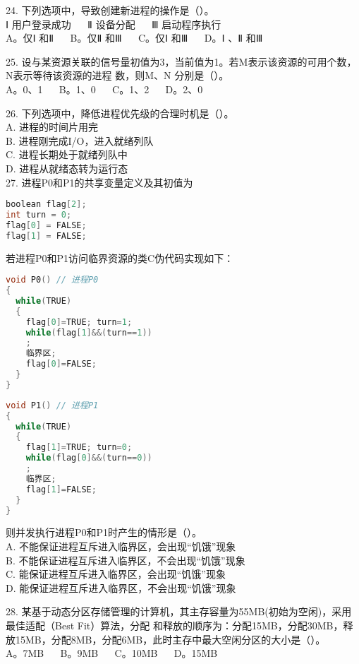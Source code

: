 24. 下列选项中，导致创建新进程的操作是（）。 \\
Ⅰ 用户登录成功 $\quad$ Ⅱ 设备分配 $\quad$ Ⅲ 启动程序执行 \\
A。仅Ⅰ 和Ⅱ $\quad$ B。仅Ⅱ 和Ⅲ $\quad$ C。仅Ⅰ 和Ⅲ $\quad$ D。Ⅰ 、Ⅱ 和Ⅲ

25. 设与某资源关联的信号量初值为3，当前值为1。若M表示该资源的可用个数，N表示等待该资源的进程
数，则M、N 分别是（）。 \\
A。0、1 $\quad$ B。1、0 $\quad$ C。1、2 $\quad$ D。2、0

26. 下列选项中，降低进程优先级的合理时机是（）。 \\
A. 进程的时间片用完 \\
B. 进程刚完成I/O，进入就绪列队 \\
C. 进程长期处于就绪列队中 \\
D. 进程从就绪态转为运行态 \\

27. 进程P0和P1的共享变量定义及其初值为 \\
\begin{lstlisting}[language=cpp]
boolean flag[2];
int turn = 0;
flag[0] = FALSE;
flag[1] = FALSE;
\end{lstlisting}
若进程P0和P1访问临界资源的类C伪代码实现如下：
\begin{lstlisting}[language=cpp]
void P0() // 进程P0
{
  while(TRUE)
  {
    flag[0]=TRUE; turn=1;
    while(flag[1]&&(turn==1))
    ;
    临界区;
    flag[0]=FALSE;
  }
}
\end{lstlisting}

\begin{lstlisting}[language=cpp]
void P1() // 进程P1
{
  while(TRUE)
  {
    flag[1]=TRUE; turn=0;
    while(flag[0]&&(turn==0))
    ;
    临界区;
    flag[1]=FALSE;
  }
}
\end{lstlisting}
则并发执行进程P0和P1时产生的情形是（）。  \\
A. 不能保证进程互斥进入临界区，会出现“饥饿”现象 \\
B. 不能保证进程互斥进入临界区，不会出现“饥饿”现象 \\
C. 能保证进程互斥进入临界区，会出现“饥饿”现象 \\
D. 能保证进程互斥进入临界区，不会出现“饥饿”现象

28. 某基于动态分区存储管理的计算机，其主存容量为55MB(初始为空闲)，采用最佳适配（Best Fit）算法，分配
和释放的顺序为：分配15MB，分配30MB，释放15MB，分配8MB，分配6MB，此时主存中最大空闲分区的大小是（）。 \\
A。7MB $\quad$ B。9MB $\quad$ C。10MB $\quad$ D。15MB

